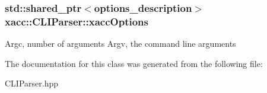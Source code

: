 \subsubsection[{\texorpdfstring{xacc\+Options}{xaccOptions}}]{\setlength{\rightskip}{0pt plus 5cm}std\+::shared\+\_\+ptr$<$options\+\_\+description$>$ xacc\+::\+C\+L\+I\+Parser\+::xacc\+Options\hspace{0.3cm}{\ttfamily [protected]}}\hypertarget{a00030_a0f1564966cc40c340027aecb386c4469}{}\label{a00030_a0f1564966cc40c340027aecb386c4469}
Argc, number of arguments Argv, the command line arguments 

The documentation for this class was generated from the following file\+:\begin{DoxyCompactItemize}
\item 
C\+L\+I\+Parser.\+hpp\end{DoxyCompactItemize}
